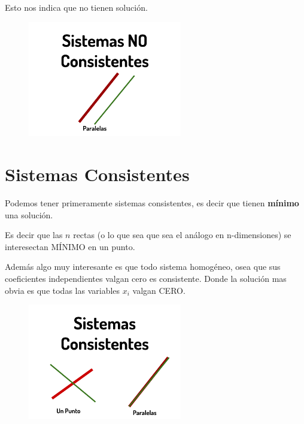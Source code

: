 \documentclass[12pt, fleqn]{report}                             %
\theoremstyle{break}                                            %
\begin{document}
            Esto nos indica que no tienen solución.

            \begin{figure}[h]
                \centering
                \includegraphics[width=0.60\textwidth]{SistemasNoConsistentes}
            \end{figure}




                
        \clearpage
        \section{Sistemas Consistentes}

            Podemos tener primeramente sistemas consistentes, es decir que tienen \textbf{mínimo}
            una solución.

            Es decir que las $n$ rectas (o lo que sea que sea el análogo en n-dimensiones)
            se interesectan MÍNIMO en un punto.

            Además algo muy interesante es que todo sistema homogéneo, osea que sus coeficientes
            independientes valgan cero es consistente. Donde la solución mas obvia es que
            todas las variables $x_i$ valgan CERO.

            \begin{figure}[h]
                \centering
                \includegraphics[width=0.60\textwidth]{SistemasConsistentes}
            \end{figure}
\end{document}
